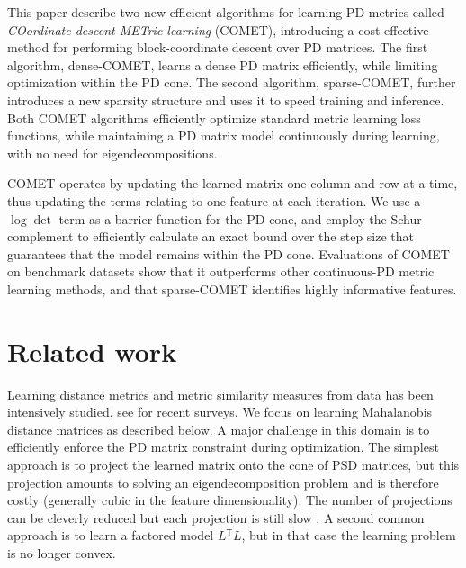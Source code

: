 \documentclass[twoside,11pt]{article}
\newcommand\todo[1]{\textbf{<ToDo:#1}!>}
\newcommand\mat[1]{{#1}}
\newcommand{\T}{{}^\mathsf{T}}
\newcommand{\ignore}[1]{}
\newcommand{\cholL}{\mat{L}}
\begin{document}
This paper describe two new efficient algorithms for learning PD metrics called {\em{COordinate-descent METric learning}} (COMET), introducing a cost-effective method for performing block-coordinate descent over PD  matrices. The first algorithm, dense-COMET, learns a dense PD matrix efficiently, while limiting optimization within the PD cone. The second algorithm, sparse-COMET, further introduces a new sparsity structure and uses it to speed training and inference. Both COMET algorithms  efficiently optimize standard metric learning loss functions, while maintaining a PD matrix model continuously during learning, with no need for eigendecompositions. 

COMET operates by updating the learned matrix one column and row at a time, thus updating the terms relating to one feature at each iteration. We use a $\log \det$ term as a barrier function for the PD cone, and employ the Schur complement to efficiently calculate an exact bound over the step size that guarantees that the model remains within the PD cone. Evaluations of COMET on benchmark datasets show that it outperforms other continuous-PD metric learning methods, and that sparse-COMET identifies highly informative features. 



\ignore{Furthermore an important challenge for metric learning is the case where the set of features is not fixed in advance, but changes with time. This is a typical scenario in many real life applications of learning: as more data accumulates, it is possible to estimate more parameters accurately, so more features and signals are gradually added to existing systems. It is therefore desirable to develop algorithms that can learn metrics in face of a growing feature set. Our method naturally adapts to this setting, by optimizing the metric matrix one column-row at a time.}

\section{Related work}
\vskip -5pt
Learning distance metrics and metric similarity measures from data has been intensively studied, see \citet{bellet2013survey, kulis2012survey} for recent surveys. We focus on learning Mahalanobis distance matrices as described below. A major challenge in this domain is to efficiently enforce the PD matrix constraint during optimization. The simplest approach is to project the learned matrix onto the cone of PSD matrices, but this projection amounts to solving an eigendecomposition problem and is therefore costly (generally cubic in the feature dimensionality). The number of projections can be cleverly reduced but each projection is still slow \citep{qianHD, qian}. A second common approach is to learn a factored model $\cholL\T \cholL$, but in that case the learning problem is no longer convex. 
\end{document}
